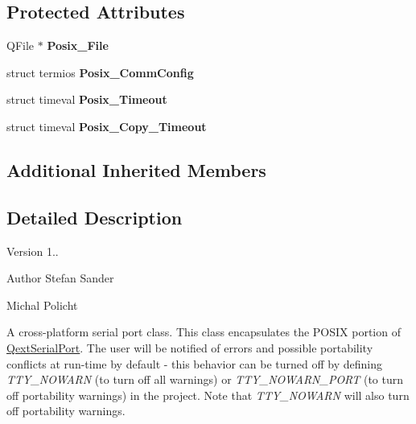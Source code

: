 \subsection*{Protected Attributes}
\begin{DoxyCompactItemize}
\item 
\mbox{\label{class_posix___qext_serial_port_ac4fcc5ae9850c3bc9952a13e4ef82273}} 
Q\+File $\ast$ {\bfseries Posix\+\_\+\+File}
\item 
\mbox{\label{class_posix___qext_serial_port_a4946a554d3cfcd190b4df72f6f44f6eb}} 
struct termios {\bfseries Posix\+\_\+\+Comm\+Config}
\item 
\mbox{\label{class_posix___qext_serial_port_a0a876397917fbf082b56ae43ab2b4b7b}} 
struct timeval {\bfseries Posix\+\_\+\+Timeout}
\item 
\mbox{\label{class_posix___qext_serial_port_ae5813ea1fd76c8c5a8948c4085d3e84e}} 
struct timeval {\bfseries Posix\+\_\+\+Copy\+\_\+\+Timeout}
\end{DoxyCompactItemize}
\subsection*{Additional Inherited Members}


\subsection{Detailed Description}
\begin{DoxyVersion}{Version}
1.. 
\end{DoxyVersion}
\begin{DoxyAuthor}{Author}
Stefan Sander 

Michal Policht
\end{DoxyAuthor}
A cross-\/platform serial port class. This class encapsulates the P\+O\+S\+IX portion of \mbox{\hyperlink{class_qext_serial_port}{Qext\+Serial\+Port}}. The user will be notified of errors and possible portability conflicts at run-\/time by default -\/ this behavior can be turned off by defining {\itshape T\+T\+Y\+\_\+\+N\+O\+W\+A\+RN} (to turn off all warnings) or {\itshape T\+T\+Y\+\_\+\+N\+O\+W\+A\+R\+N\+\_\+\+P\+O\+RT} (to turn off portability warnings) in the project. Note that {\itshape T\+T\+Y\+\_\+\+N\+O\+W\+A\+RN} will also turn off portability warnings. 

